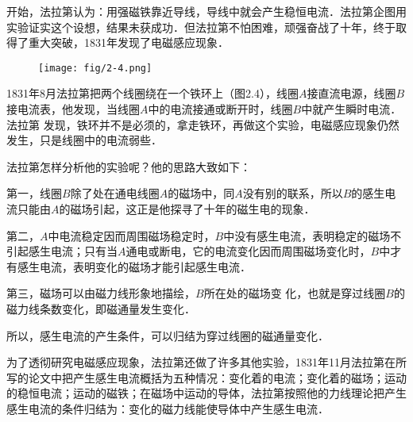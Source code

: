 开始，法拉第认为：用强磁铁靠近导线，导线中就会产生稳恒电流．法拉第企图用实验证实这个设想，结果未获成功．但法拉第不怕困难，顽强奋战了十年，终于取得了重大突破，1831年发现了电磁感应现象．
\begin{figure}[htp]\centering
\texttt{[image: fig/2-4.png]}
\caption{}
\end{figure}

1831年8月法拉第把两个线圈绕在一个铁环上（图2.4），线圈$A$接直流电源，线圈$B$接电流表，他发现，当线圈$A$中的电流接通或断开时，线圈$B$中就产生瞬时电流．法拉第
发现，铁环并不是必须的，拿走铁环，再做这个实验，电磁感应现象仍然发生，只是线圈中的电流弱些．

法拉第怎样分析他的实验呢？他的思路大致如下：

第一，线圈$B$除了处在通电线圈$A$的磁场中，同$A$没有别的联系，所以$B$的感生电流只能由$A$的磁场引起，这正是他探寻了十年的磁生电的现象．

第二，$A$中电流稳定因而周围磁场稳定时，$B$中没有感生电流，表明稳定的磁场不引起感生电流；只有当$A$通电或断电，它的电流变化因而周围磁场变化时，$B$中才有感生电流，表明变化的磁场才能引起感生电流．

第三，磁场可以由磁力线形象地描绘，$B$所在处的磁场变
化，也就是穿过线圈$B$的磁力线条数变化，即磁通量发生变化．

所以，感生电流的产生条件，可以归结为穿过线圈的磁通量变化．

为了透彻研究电磁感应现象，法拉第还做了许多其他实验，1831年11月法拉第在所写的论文中把产生感生电流概括为五种情况：变化着的电流；变化着的磁场；运动的稳恒电流；运动的磁铁；在磁场中运动的导体，法拉第按照他的力线理论把产生感生电流的条件归结为：变化的磁力线能使导体中产生感生电流．

